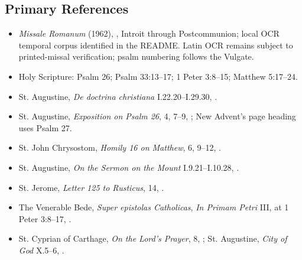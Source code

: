 \begin{deepstudy}
\sectionguard
\section*{Primary References}
{\small
\begin{itemize}
\item \emph{Missale Romanum} (1962), , Introit through Postcommunion; local OCR temporal corpus identified in the README. Latin OCR remains subject to printed-missal verification; psalm numbering follows the Vulgate.
\item Holy Scripture: Psalm 26; Psalm 33:13--17; 1 Peter 3:8--15; Matthew 5:17--24.
\item St. Augustine, \emph{De doctrina christiana} I.22.20--I.29.30, .
\item St. Augustine, \emph{Exposition on Psalm 26}, 4, 7--9, ; New Advent's page heading uses Psalm 27.
\item St. John Chrysostom, \emph{Homily 16 on Matthew}, 6, 9--12, .
\item St. Augustine, \emph{On the Sermon on the Mount} I.9.21--I.10.28, .
\item St. Jerome, \emph{Letter 125 to Rusticus}, 14, .
\item The Venerable Bede, \emph{Super epistolas Catholicas}, \emph{In Primam Petri} III, at 1 Peter 3:8--17, .
\item St. Cyprian of Carthage, \emph{On the Lord's Prayer}, 8, ; St. Augustine, \emph{City of God} X.5--6, .
\end{itemize}
}

\end{deepstudy}


